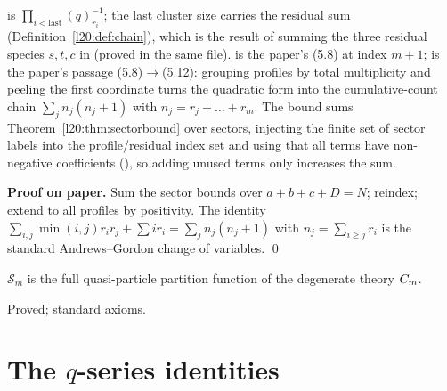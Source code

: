 \begin{dictionary}
 is $\prod_{i<\text{last}}(q)_{r_i}^{-1}$; the last cluster size carries the
residual sum  (Definition~\ref{l20:def:chain}), which is the result of summing the three
residual species $s,t,c$ in  (proved in the same file). 
is the paper's (5.8) at index $m+1$;  is the paper's passage
(5.8)$\to$(5.12): grouping profiles by total multiplicity and peeling the first coordinate turns the quadratic form
into the cumulative-count chain $\sum_jn_j(n_j+1)$ with $n_j=r_j+\dots+r_m$. The bound sums
Theorem~\ref{l20:thm:sectorbound} over sectors, injecting the finite set of sector labels into the profile/residual
index set and using that all terms have non-negative coefficients (), so adding unused terms
only increases the sum.
\end{dictionary}

\textbf{Proof on paper.} Sum the sector bounds over $a+b+c+D=N$; reindex; extend to all profiles by
positivity. The identity $\sum_{i,j}\min(i,j)r_ir_j+\sum ir_i=\sum_jn_j(n_j+1)$ with $n_j=\sum_{i\ge j}r_i$ is the
standard Andrews--Gordon change of variables. \qed

\begin{physics}
$\mathcal S_m$ is the full quasi-particle partition function of the degenerate theory $C_m$.
\end{physics}

\begin{status}
Proved; standard axioms.
\end{status}

\section{The \texorpdfstring{$q$}{q}-series identities}\label{l20:sec:m4}

